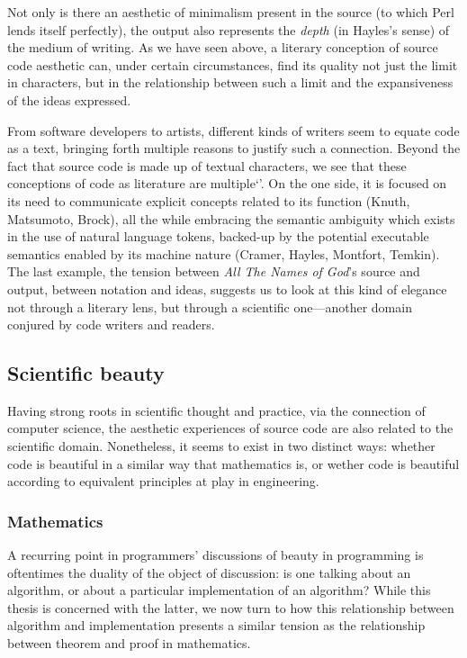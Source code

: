 Not only is there an aesthetic of minimalism present in the source (to which Perl lends itself perfectly), the output also represents the \emph{depth} (in Hayles's sense) of the medium of writing. As we have seen above, a literary conception of source code aesthetic can, under certain circumstances, find its quality not just the limit in characters, but in the relationship between such a limit and the expansiveness of the ideas expressed.

\vspace{1\baselineskip}

From software developers to artists, different kinds of writers seem to equate code as a text, bringing forth multiple reasons to justify such a connection. Beyond the fact that source code is made up of textual characters, we see that these conceptions of code as literature are multiple`'. On the one side, it is focused on its need to communicate explicit concepts related to its function (Knuth, Matsumoto, Brock), all the while embracing the semantic ambiguity which exists in the use of natural language tokens, backed-up by the potential executable semantics enabled by its machine nature (Cramer, Hayles, Montfort, Temkin).
The last example, the tension between \emph{All The Names of God}'s source and output, between notation and ideas, suggests us to look at this kind of elegance not through a literary lens, but through a scientific one—another domain conjured by code writers and readers.

\subsection{Scientific beauty}

Having strong roots in scientific thought and practice, via the connection of computer science, the aesthetic experiences of source code are also related to the scientific domain. Nonetheless, it seems to exist in two distinct ways: whether code is beautiful in a similar way that mathematics is, or wether code is beautiful according to equivalent principles at play in engineering.

\subsubsection{Mathematics}

A recurring point in programmers' discussions of beauty in programming is oftentimes the duality of the object of discussion: is one talking about an algorithm, or about a particular implementation of an algorithm? While this thesis is concerned with the latter, we now turn to how this relationship between algorithm and implementation presents a similar tension as the relationship between theorem and proof in mathematics.

